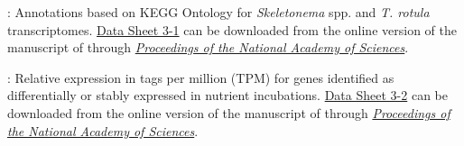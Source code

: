     \begin{DS3}
    
    \item \label{DS31}: Annotations based on KEGG Ontology for \textit{Skeletonema} spp. and \textit{T. rotula} transcriptomes. \href{http://www.pnas.org/content/suppl/2015/04/09/1421993112.DCSupplemental/pnas.1421993112.sd01.xlsx}{Data Sheet 3-1} can be downloaded from the online version of the manuscript of \citet{Alexander2015} through \href{http://www.pnas.org/content/112/17/E2182.full}{\textit{Proceedings of the National Academy of Sciences}}. 
    \item \label{DS32}: Relative expression in tags per million (TPM) for genes identified as differentially or stably expressed in nutrient incubations. \href{http://www.pnas.org/content/suppl/2015/04/09/1421993112.DCSupplemental/pnas.1421993112.sd02.xlsx}{Data Sheet 3-2} can be downloaded from the online version of the manuscript of \citet{Alexander2015} through \href{http://www.pnas.org/content/112/17/E2182.full}{\textit{Proceedings of the National Academy of Sciences}}. 
  
    \end{DS3}


